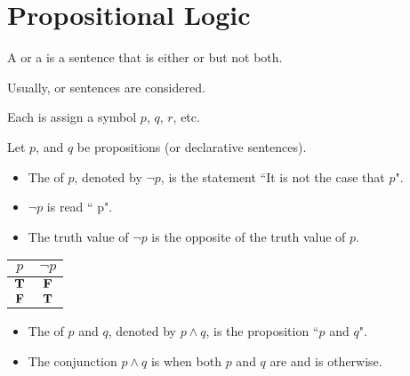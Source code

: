 \chapter{Propositional Logic}

  \par A  or a  is a sentence that is either  or  but not both.

  \par Usually,  or  sentences are considered.
  \par Each  is assign a symbol $p$, $q$, $r$, etc.

  \par {}
  \par Let $p$, and $q$ be propositions (or declarative sentences).

      \begin{itemize}
        \item The  of $p$, denoted by $\lnot p$, is the statement ``It is not the case that $p$".
        \item $\lnot p$ is read `` p".
        \item The truth value of $\lnot p$ is the opposite of the truth value of $p$.
      \end{itemize}
      \begin{center}
        \begin{tabular}{|c|c|}
          \hline
          $p$ & $\lnot p$ \\
          \hline
          $\mathbf{T}$ & $\mathbf{F}$ \\
          \hline
          $\mathbf{F}$ & $\mathbf{T}$ \\
          \hline
        \end{tabular}
      \end{center}

      \begin{itemize}
        \item The  of $p$ and $q$, denoted by $p \land q$, is the proposition ``$p$ and $q$".
        \item The conjunction $p \land q$ is  when both $p$ and $q$ are 
        and is  otherwise.
      \end{itemize}

